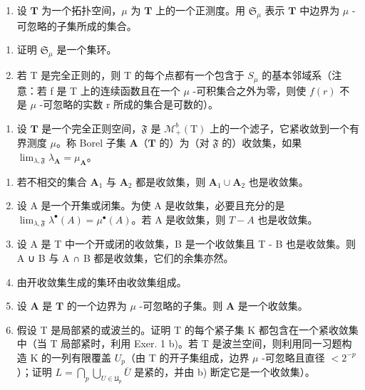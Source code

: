 \exercisesection{}

\begin{enumerate}
\def\labelenumi{\arabic{enumi})}
\tightlist
\item
  设 \(\mathbf{T}\) 为一个拓扑空间，\(\mu\) 为 \(\mathbf{T}\) 上的一个正测度。用 \(\mathfrak{S}_{\mu}\) 表示 \(\mathbf{T}\) 中边界为 \(\mu\) -可忽略的子集所成的集合。
\end{enumerate}

\begin{enumerate}
\def\labelenumi{\alph{enumi})}
\item
  证明 \(\mathfrak{S}_{\mu}\) 是一个集环。
\item
  若 T 是完全正则的，则 T 的每个点都有一个包含于 \(S_{\mu}\) 的基本邻域系（注意：若 f 是 T 上的连续函数且在一个 \(\mu\) -可积集合之外为零，则使 \(f(r)\) 不是 \(\mu\) -可忽略的实数 r 所成的集合是可数的）。
\end{enumerate}

\begin{enumerate}
\def\labelenumi{\arabic{enumi})}
\setcounter{enumi}{1}
\tightlist
\item
  设 \(\mathbf{T}\) 是一个完全正则空间，\(\mathfrak{F}\) 是 \(\mathcal{M}_{+}^{b}(\mathrm{T})\) 上的一个滤子，它紧收敛到一个有界测度 \(\mu\)。称 Borel 子集 \(\mathbf{A}\)（\(\mathbf{T}\) 的）为（对 \(\mathfrak{F}\) 的）收敛集，如果 \(\lim_{\lambda,\mathfrak{F}} \lambda_{\mathbf{A}} = \mu_{\mathbf{A}}\)。
\end{enumerate}

\begin{enumerate}
\def\labelenumi{\alph{enumi})}
\item
  若不相交的集合 \(\mathbf{A}_1\) 与 \(\mathbf{A}_2\) 都是收敛集，则 \(\mathbf{A}_1 \cup \mathbf{A}_2\) 也是收敛集。
\item
  设 A 是一个开集或闭集。为使 A 是收敛集，必要且充分的是 \(\lim_{\lambda,\mathfrak{F}} \lambda^{\bullet}(A) = \mu^{\bullet}(A)\)。若 A 是收敛集，则 \(T - A\) 也是收敛集。
\item
  设 A 是 T 中一个开或闭的收敛集，B 是一个收敛集且 T - B 也是收敛集。则 A ∪ B 与 A ∩ B 都是收敛集，它们的余集亦然。
\item
  由开收敛集生成的集环由收敛集组成。
\item
  设 \(\mathbf{A}\) 是 \(\mathbf{T}\) 的一个边界为 \(\mu\) -可忽略的子集。则 \(\mathbf{A}\) 是一个收敛集。
\item
  假设 T 是局部紧的或波兰的。证明 T 的每个紧子集 K 都包含在一个紧收敛集中（当 T 局部紧时，利用 Exer. 1 b)。若 T 是波兰空间，则利用同一习题构造 K 的一列有限覆盖 \(U_{p}\)（由 T 的开子集组成，边界 \(\mu\) -可忽略且直径 \(<2^{-p}\)）；证明 \(L=\bigcap_{p}\bigcup_{U\in\mathfrak{U}_{p}}\overline{U}\) 是紧的，并由 b) 断定它是一个收敛集）。
\end{enumerate}


